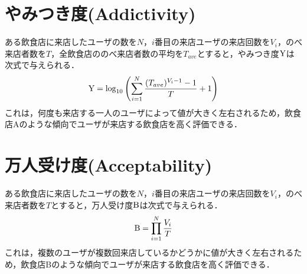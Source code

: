 \section{やみつき度(Addictivity)}

ある飲食店に来店したユーザの数を$N$，$i$番目の来店ユーザの来店回数を$V_i$，のべ来店者数を$T$，全飲食店ののべ来店者数の平均を$T_{ave}$とすると，やみつき度$\rm Y$は次式で与えられる．
\begin{equation}
	{\rm Y} = \log_{10}{\left(\sum^{N}_{i=1} \frac{(T_{ave})^{V_i-1}-1}{T}+1\right)}
\end{equation}
これは，何度も来店する一人のユーザによって値が大きく左右されるため，飲食店Aのような傾向でユーザが来店する飲食店を高く評価できる．

\section{万人受け度(Acceptability)}
ある飲食店に来店したユーザの数を$N$，$i$番目の来店ユーザの来店回数を$V_i$，のべ来店者数を$T$とすると，万人受け度$\rm B$は次式で与えられる．
\begin{equation}
	{\rm B} = \prod^N_{i=1}\frac{V_i}{T}
\end{equation}
これは，複数のユーザが複数回来店しているかどうかに値が大きく左右されるため，飲食店Bのような傾向でユーザが来店する飲食店を高く評価できる．

